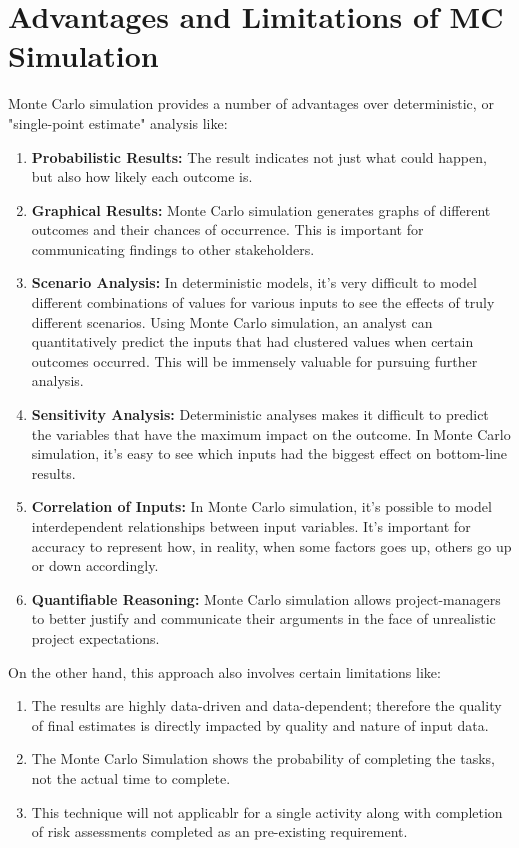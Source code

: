 \section{Advantages and Limitations of MC Simulation}
Monte Carlo simulation provides a number of advantages over deterministic, or "single-point estimate" analysis like:
\begin{enumerate}
	\item \textbf{Probabilistic Results:} The result indicates not just what could happen, but also how likely each outcome is.
	 \item \textbf{Graphical Results:} Monte Carlo simulation generates graphs of different outcomes and their chances of occurrence. This is important for communicating findings to other stakeholders.
	 \item \textbf{Scenario Analysis:} In deterministic models, it’s very difficult to model different combinations of values for various inputs to see the effects of truly different scenarios. Using Monte Carlo simulation, an analyst can quantitatively predict the inputs that had clustered values when certain outcomes occurred. This will be immensely valuable for pursuing further analysis.
     \item \textbf{Sensitivity Analysis:} Deterministic analyses makes it difficult to predict the variables that have the maximum impact on the outcome. In Monte Carlo simulation, it’s easy to see which inputs had the biggest effect on bottom-line results.
	 \item \textbf{Correlation of Inputs:} In Monte Carlo simulation, it's possible to model interdependent relationships between input variables. It’s important for accuracy to represent how, in reality, when some factors goes up, others go up or down accordingly.
	 \item \textbf{Quantifiable Reasoning:} Monte Carlo simulation allows project-managers to better justify and communicate their arguments in the face of unrealistic project expectations.
\end{enumerate}

 

On the other hand, this approach also involves certain limitations like:
\begin{enumerate}
	\item The results are highly data-driven and data-dependent; therefore the quality of final estimates is directly impacted by quality and nature of input data.
	\item The Monte Carlo Simulation shows the probability of completing the tasks, not the actual time to complete.
	\item  This technique will not applicablr for a single activity along with completion of risk assessments completed as an pre-existing requirement.

\end{enumerate} 



















